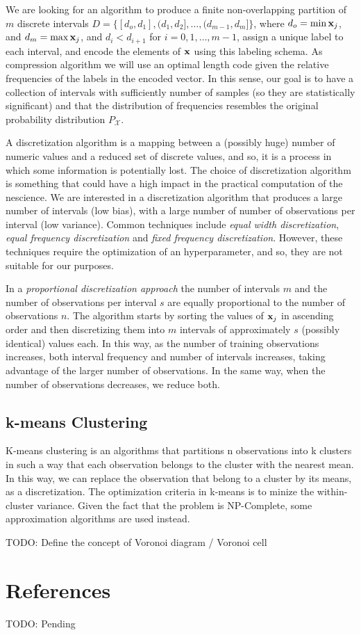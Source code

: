We are looking for an algorithm to produce a finite non-overlapping partition of $m$ discrete intervals $D=\{ [d_o, d_1], (d_1, d_2], \ldots, (d_{m-1}, d_m] \}$, where $d_o = \min{\bold{x}_j}$, and $d_m = \max{\bold{x}_j}$, and $d_i < d_{i+1}$ for $i = 0, 1, \ldots, m-1$, assign a unique label to each interval, and encode the elements of $\bold{x}$ using this labeling schema. As compression algorithm we will use an optimal length code given the relative frequencies of the labels in the encoded vector. In this sense, our goal is to have a collection of intervals with sufficiently number of samples (so they are statistically significant) and that the distribution of frequencies resembles the original probability distribution $P_\mathcal{X}$.

A discretization algorithm is a mapping between a (possibly huge) number of numeric values and a reduced set of discrete values, and so, it is a process in which some information is potentially lost. The choice of discretization algorithm is something that could have a high impact in the practical computation of the nescience. We are interested in a discretization algorithm that produces a large number of intervals (low bias), with a large number of number of observations per interval (low variance). Common techniques include \emph{equal width discretization}, \emph{equal frequency discretization} and \emph{fixed frequency discretization}. However, these techniques require the optimization of an hyperparameter, and so, they are not suitable for our purposes.

In a \emph{proportional discretization approach} the number of intervals $m$ and the number of observations per interval $s$ are equally proportional to the number of observations $n$. The algorithm starts by sorting the values of $\bold{x}_j$ in ascending order and then discretizing them into $m$ intervals of approximately $s$ (possibly identical) values each. In this way, as the number of training observations increases, both interval frequency and number of intervals increases, taking advantage of the larger number of observations. In the same way, when the number of observations decreases, we reduce both.

\subsection{k-means Clustering}
\label{sec:kmeans_clustering}

K-means clustering is an algorithms that partitions n observations into k clusters in such a way that each observation belongs to the cluster with the nearest mean. In this way, we can replace the observation that belong to a cluster by its means, as a discretization. The optimization criteria in k-means is to minize the within-cluster variance. Given the fact that the problem is NP-Complete, some approximation algorithms are used instead.

{\color{red} TODO: Define the concept of Voronoi diagram / Voronoi cell}


%
%
\section*{References}

{\color{red} TODO: Pending}

